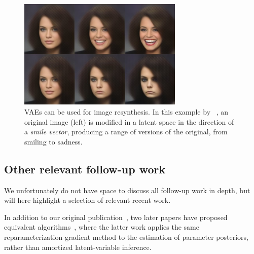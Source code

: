 \documentclass[MAL,biber]{nowfnt} %
\begin{document}
\begin{figure}
	\centering
	\includegraphics[width=0.7\textwidth]{figures/happysad_2.jpg}
	\caption{VAEs can be used for image resynthesis. In this example by ~\cite{white2016sampling}, an original image (left) is modified in a latent space in the direction of a \emph{smile vector}, producing a range of versions of the original, from smiling to sadness.}
	\label{fig:happysad}
\end{figure}

\subsection{Other relevant follow-up work}

We unfortunately do not have space to discuss all follow-up work in depth, but will here  highlight a selection of relevant recent work.

In addition to our original publication~\citep{kingma2013auto}, two later papers have proposed equivalent algorithms~\citep{rezende2014stochastic,lazaro2014doubly}, where the latter work applies the same reparameterization gradient method to the estimation of parameter posteriors, rather than amortized latent-variable inference.
\end{document}
